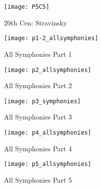 \begin{figure}[h]
\caption{20th Cen: Stravinsky}
\centering
\texttt{[image: P5C5]}
\end{figure}

\begin{figure}[h]
\caption{All Symphonies Part 1}
\centering
\texttt{[image: p1-2\_allsymphonies]}
\end{figure}

\begin{figure}[h]
\caption{All Symphonies Part 2}
\centering
\texttt{[image: p2\_allsymphonies]}
\end{figure}

\begin{figure}[h]
\caption{All Symphonies Part 3}
\centering
\texttt{[image: p3\_symphonies]}
\end{figure}

\begin{figure}[h]
\caption{All Symphonies Part 4}
\centering
\texttt{[image: p4\_allsymphonies]}
\end{figure}

\begin{figure}[h]
\caption{All Symphonies Part 5}
\centering
\texttt{[image: p5\_allsymphonies]}
\end{figure}